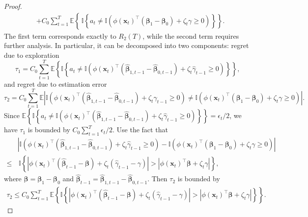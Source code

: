 \documentclass[12pt]{article}
\begin{document}
\begin{proof}
\begin{align*}
    &+ C_0 \sum_{t=1}^{T} \mathbb{E} \left\{\, \mathbb{I} \left\{ a_t \neq \mathbb{I} \left(\phi(\bm{x}_t)^{\top} (\bm{\beta}_1 - \bm{\beta}_0) + \zeta_t \gamma \ge 0 \right) \right\} \right\}.
\end{align*}
The first term corresponds exactly to $R_2(T)$, while the second term requires further analysis. In particular, it can be decomposed into two components: regret due to exploration
\begin{equation*}
    \tau_1= C_0 \sum_{t=1}^{T} \mathbb{E} \left\{ \mathbb{I} \left\{ a_t \neq \mathbb{I} \left(\phi(\bm{x}_t)^{\top} (\widehat{\bm{\beta}}_{1,t-1} - \widehat{\bm{\beta}}_{0,t-1}) + \zeta_t \widehat{\gamma}_{t-1} \ge 0 \right) \right\} \right\},
\end{equation*}
and regret due to estimation error
\begin{equation*}
     \tau_2= C_0  \sum_{t=1}^{T} \mathbb{E} \left|\mathbb{I} \left(\phi(\bm{x}_t)^{\top} (\widehat{\bm{\beta}}_{1,t-1} - \widehat{\bm{\beta}}_{0,t-1}) + \zeta_t \widehat{\gamma}_{t-1} \ge 0 \right) \neq \mathbb{I} \left(\phi(\bm{x}_t)^{\top} (\bm{\beta}_1 - \bm{\beta}_0) + \zeta_t \gamma \ge 0 \right) \right|.
\end{equation*}
Since $\mathbb{E} \left\{ \mathbb{I} \left\{ a_t \neq \mathbb{I} \left(\phi(\bm{x}_t)^{\top} (\widehat{\bm{\beta}}_{1,t-1} - \widehat{\bm{\beta}}_{0,t-1}) + \zeta_t \widehat{\gamma}_{t-1} \ge 0 \right) \right\} \right\} = \epsilon_t/2$, we have $\tau_1$ is bounded by $C_0 \sum_{t=1}^T \epsilon_t /2$.
Use the fact that
\begin{align*}
    &\left|\mathbb{I} \left(\phi(\bm{x}_t)^{\top} (\widehat{\bm{\beta}}_{1,t-1} - \widehat{\bm{\beta}}_{0,t-1}) + \zeta_t \widehat{\gamma}_{t-1} \ge 0 \right) - \mathbb{I} \left(\phi(\bm{x}_t)^{\top} (\bm{\beta}_1 - \bm{\beta}_0) + \zeta_t \gamma \ge 0 \right) \right| \\
    \le & \, \mathbb{I}\left\{\left| \phi(\bm{x}_t)^{\top} (\widehat{\bm{\beta}}_{t-1}-\bm{\beta}) + \zeta_t (\widehat{\gamma}_{t-1} - \gamma) \right| > \left| \phi(\bm{x}_t)^{\top} \bm{\beta} + \zeta_t \gamma \right| \right\},
\end{align*}
where $\bm{\beta} = \bm{\beta}_1 - \bm{\beta}_0$ and $\widehat{\bm{\beta}}_{t-1} = \widehat{\bm{\beta}}_{1,t-1} - \widehat{\bm{\beta}}_{0,t-1}$. Then $\tau_2$ is bounded by
\begin{align*}
    \tau_2 \le C_0 \sum_{t=1}^T\mathbb{E} \left\{ \mathbb{I}\left\{\left| \phi(\bm{x}_t)^{\top} (\widehat{\bm{\beta}}_{t-1}-\bm{\beta}) + \zeta_t (\widehat{\gamma}_{t-1} - \gamma) \right| > \left| \phi(\bm{x}_t)^{\top} \bm{\beta} + \zeta_t \gamma \right| \right\} \right\}.

\end{align*}
\end{proof}
\end{document}
